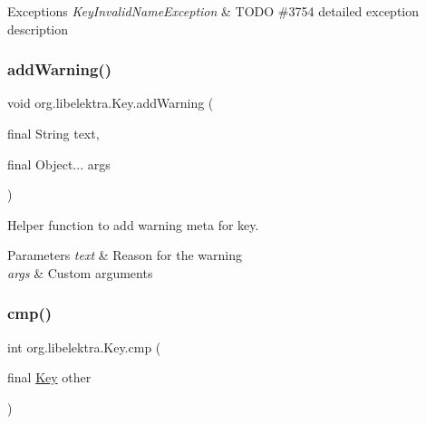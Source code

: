 \begin{DoxyExceptions}{Exceptions}
{\em Key\+Invalid\+Name\+Exception} & T\+O\+DO \#3754 detailed exception description \\
\hline
\end{DoxyExceptions}
\mbox{\label{classorg_1_1libelektra_1_1Key_a542a69d75c304dda3f78cb3b185022ee}} 
\subsubsection{\texorpdfstring{add\+Warning()}{addWarning()}}
{\footnotesize\ttfamily void org.\+libelektra.\+Key.\+add\+Warning (\begin{DoxyParamCaption}\item[{final String}]{text,  }\item[{final Object...}]{args }\end{DoxyParamCaption})\hspace{0.3cm}{\ttfamily [inline]}}



Helper function to add warning meta for key. 


\begin{DoxyParams}{Parameters}
{\em text} & Reason for the warning \\
\hline
{\em args} & Custom arguments \\
\hline
\end{DoxyParams}
\mbox{\label{classorg_1_1libelektra_1_1Key_aa5271913871c1ee2f31f32190a7e14aa}} 
\subsubsection{\texorpdfstring{cmp()}{cmp()}}
{\footnotesize\ttfamily int org.\+libelektra.\+Key.\+cmp (\begin{DoxyParamCaption}\item[{final \hyperlink{classorg_1_1libelektra_1_1Key}{Key}}]{other }\end{DoxyParamCaption})\hspace{0.3cm}{\ttfamily [inline]}}



